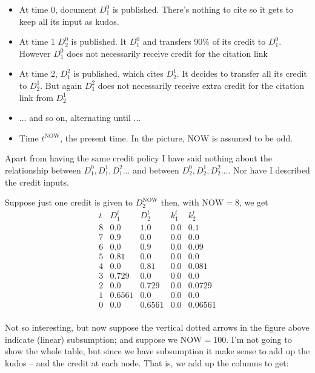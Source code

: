 \documentclass{article}
\newcommand{\now}{\mbox{NOW}}
\begin{document}
\begin{itemize}

\item
  At time 0, document $D_1^0$ is published. There's nothing to cite so
  it gets to keep all its input as kudos.

\item At time 1  $D_2^0$ is
published.  It  $D_1^0$ and transfers 90\% of its credit to
$D_1^0$. However $D_1^0$ does not necessarily receive credit for the
citation link 

\item At time 2, $D_1^2$  is published, which cites $D_2^1$. It decides to
transfer all its credit to $D_2^1$.  But again  $D_1^2$ does not
necessarily receive extra credit for the citation link from $D_2^1$

\item ... and so on, alternating until ...

\item Time $t^{\now}$, the present time.  In the picture, $\now$ is
    assumed to be odd.

\end{itemize}

Apart from having the same credit policy I have said nothing about the
relationship between $D_1^0, D_1^1, D_1^2\ldots$ and between $D_2^0,
D_2^1, D_2^2\ldots$.  Nor have I described the credit inputs.

Suppose just one credit is given to $D_2^{\now}$ then, with $\now = 8$,
we get 
\[
\begin{array}{rllll}
  t & D_1^t & D_2^t & k_1^t &k_2^t\\
  \hline
  8 & 0.0 & 1.0 & 0.0 & 0.1\\
7 & 0.9 & 0.0 & 0.0 & 0.0\\
6 & 0.0 & 0.9 & 0.0 & 0.09\\
5 & 0.81 & 0.0 & 0.0 & 0.0\\
4 & 0.0 & 0.81 & 0.0 & 0.081\\
3 & 0.729 & 0.0 & 0.0 & 0.0\\
2 & 0.0 & 0.729 & 0.0 & 0.0729\\
1 & 0.6561 & 0.0 & 0.0 & 0.0\\
0 & 0.0 & 0.6561 & 0.0 & 0.06561\\
\end{array}
\]

Not so interesting, but now suppose the vertical dotted arrows in the
figure above indicate 
(linear) subsumption; and suppose we $\now=100$.  I'm not going to show
the whole table, but since we have subsumption it make sense to add up
the kudos -- and the credit at each node.  That is, we add up the
columns to get:
\end{document}

